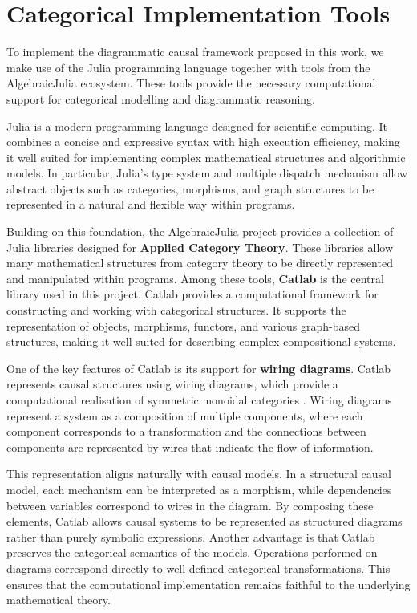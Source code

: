 \documentclass[a4paper]{report}
\begin{document}
\section{Categorical Implementation Tools}
To implement the diagrammatic causal framework proposed in this work, we make use of the Julia programming language together with tools from the AlgebraicJulia ecosystem. 
These tools provide the necessary computational support for categorical modelling and diagrammatic reasoning.

Julia is a modern programming language designed for scientific computing. It combines a concise and expressive syntax with high execution efficiency, making it well suited for implementing complex mathematical structures and algorithmic models. In particular, Julia’s type system and multiple dispatch mechanism allow abstract objects such as categories, morphisms, and graph structures to be represented in a natural and flexible way within programs.

Building on this foundation, the AlgebraicJulia project provides a collection of Julia libraries designed for \textbf{Applied Category Theory}. These libraries allow many mathematical structures from category theory to be directly represented and manipulated within programs. Among these tools, \textbf{Catlab} is the central library used in this project. Catlab provides a computational framework for constructing and working with categorical structures. It supports the representation of objects, morphisms, functors, and various graph-based structures, making it well suited for describing complex compositional systems.

One of the key features of Catlab is its support for \textbf{wiring diagrams}. Catlab represents causal structures using wiring diagrams, which provide a computational realisation of symmetric monoidal categories \cite{patterson2020wiring}. Wiring diagrams represent a system as a composition of multiple components, where each component corresponds to a transformation and the connections between components are represented by wires that indicate the flow of information.

This representation aligns naturally with causal models. In a structural causal model, each mechanism can be interpreted as a morphism, while dependencies between variables correspond to wires in the diagram. By composing these elements, Catlab allows causal systems to be represented as structured diagrams rather than purely symbolic expressions. Another advantage is that Catlab preserves the categorical semantics of the models. Operations performed on diagrams correspond directly to well-defined categorical transformations. This ensures that the computational implementation remains faithful to the underlying mathematical theory.
\end{document}
